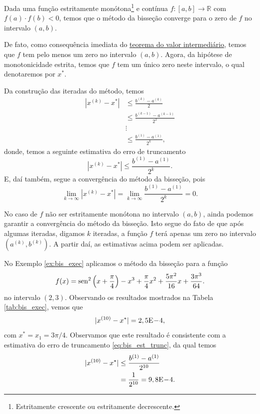 Dada uma função estritamente monótona\footnote{Estritamente crescente ou estritamente decrescente.} e contínua $f:[a, b]\to\mathbb{R}$ com $f(a)\cdot f(b) < 0$, temos que o método da bisseção converge para o zero de $f$ no intervalo $(a, b)$. 

De fato, como consequência imediata do \href{https://phkonzen.github.io/notas/AnaliseMatematicaI/cap_continuidade_sec_prop_f_cont.html}{teorema do valor intermediário}, temos que $f$ tem pelo menos um zero no intervalo $(a, b)$. Agora, da hipótese de monotonicidade estrita, temos que $f$ tem um único zero neste intervalo, o qual denotaremos por $x^{*}$.

Da construção das iteradas do método, temos
\begin{align}
  |x^{(k)} - x^{*}| &\leq \frac{b^{(k)}-a^{(k)}}{2}\\
  &\leq \frac{b^{(k-1)}-a^{(k-1)}}{2^2}\\
  &\vdots \\
  &\leq \frac{b^{(1)}-a^{(1)}}{2^k},
\end{align}
donde, temos a seguinte estimativa do erro de truncamento
\begin{equation}\label{eq:bis_est_trunc}
  |x^{(k)} - x^{*}| \leq \frac{b^{(1)}-a^{(1)}}{2^k}.
\end{equation}
E, daí também, segue a convergência do método da bisseção, pois
\begin{equation}
  \lim_{k\to\infty} |x^{(k)}-x^{*}| = \lim_{k\to\infty} \frac{b^{(1)}-a^{(1)}}{2^k} = 0.
\end{equation}

\begin{obs}
  No caso de $f$ não ser estritamente monótona no intervalo $(a, b)$, ainda podemos garantir a convergência do método da bisseção. Isto segue do fato de que após algumas iteradas, digamos $k$ iteradas, a função $f$ terá apenas um zero no intervalo $(a^{(k)}, b^{(k)})$. A partir daí, as estimativas acima podem ser aplicadas.
\end{obs}

\begin{ex}\label{ex:bis_conv}
  No Exemplo \ref{ex:bis_exec} aplicamos o método da bisseção para a função
\begin{equation}
  f(x) = \operatorname{sen}^2\left(x+\frac{\pi}{4}\right) - x^3 + \frac{\pi}{4}x^2 + \frac{5\pi^2}{16}x + \frac{3\pi^3}{64}.
\end{equation}
no intervalo $(2, 3)$. Observando os resultados mostrados na Tabela \ref{tab:bis_exec}, vemos que
\begin{equation}
  |x^{(10)}-x^*| = 2,5\mathrm{E}\!-\!4,
\end{equation}
com $x^* = x_1 = 3\pi/4$. Observamos que este resultado é consistente com a estimativa do erro de truncamento \eqref{eq:bis_est_trunc}, da qual temos
\begin{align}
  |x^{(10)} - x^*| &\leq \frac{b^{(1)}-a^{(1)}}{2^{10}}\\
  &= \frac{1}{2^{10}} = 9,8\mathrm{E}\!-\!4.
\end{align}
\end{ex}

